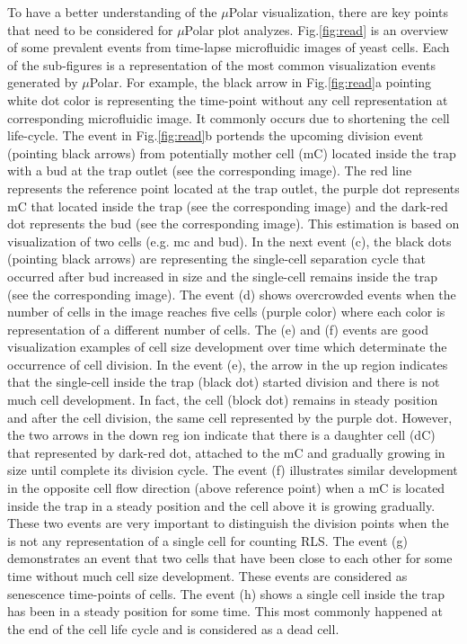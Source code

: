 \documentclass[conference]{IEEEtran}
\begin{document}
To have a better understanding of the $\mu$Polar visualization, there are key points that need to be considered for $\mu$Polar plot analyzes. Fig.\ref{fig:read} is an overview of some prevalent events from time-lapse microfluidic images of yeast cells. Each of the sub-figures is a representation of the most common visualization events generated by $\mu$Polar. For example, the black arrow in Fig.\ref{fig:read}a pointing white dot color is representing the time-point without any cell representation at corresponding microfluidic image. It commonly occurs due to shortening the cell life-cycle. The event in Fig.\ref{fig:read}b portends the upcoming division event (pointing black arrows) from potentially mother cell (mC) located inside the trap with a bud at the trap outlet (see the corresponding image). The red line represents the reference point located at the trap outlet, the purple dot represents mC that located inside the trap (see the corresponding image) and the dark-red dot represents the bud (see the corresponding image). This estimation is based on  visualization of two cells (e.g. mc and bud). In the next event (c), the black dots (pointing black arrows) are representing the single-cell separation cycle that occurred after bud increased in size and the single-cell remains inside the trap (see the corresponding image). The event (d) shows overcrowded events when the number of cells in the image reaches five cells (purple color) where each color is representation of a different number of cells. The (e) and (f) events are good visualization examples of cell size development over time which determinate the occurrence of cell division. In the event (e), the arrow in the up region indicates that the single-cell inside the trap (black dot) started division and there is not much cell development. In fact, the cell (block dot) remains in steady position and after the cell division, the same cell represented by the purple dot. However, the two arrows in the down reg ion indicate that there is a daughter cell (dC) that represented by dark-red dot, attached to the mC and gradually growing in size until complete its division cycle. The event (f) illustrates similar development in the opposite cell flow direction (above reference point) when a mC is located inside the trap in a steady position and the cell above it is growing gradually. These two events are very important to distinguish the division points when the is not any representation of a single cell for counting RLS. The event (g) demonstrates an event that two cells that have been close to each other for some time without much cell size development. These events are considered as senescence time-points of cells. The event (h) shows a single cell inside the trap has been in a steady position for some time. This most commonly happened at the end of the cell life cycle and is considered as a dead cell.
\end{document}
